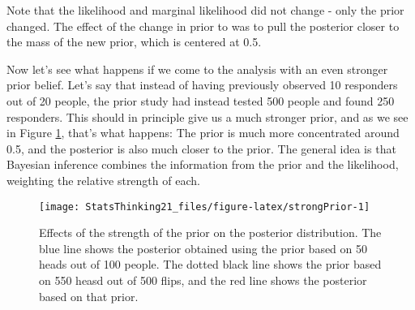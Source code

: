 \documentclass[]{book}
\newenvironment{Shaded}{\begin{snugshade}}{\end{snugshade}}
\newcommand{\KeywordTok}[1]{\textcolor[rgb]{0.13,0.29,0.53}{\textbf{#1}}}
\newcommand{\DataTypeTok}[1]{\textcolor[rgb]{0.13,0.29,0.53}{#1}}
\newcommand{\DecValTok}[1]{\textcolor[rgb]{0.00,0.00,0.81}{#1}}
\newcommand{\StringTok}[1]{\textcolor[rgb]{0.31,0.60,0.02}{#1}}
\newcommand{\CommentTok}[1]{\textcolor[rgb]{0.56,0.35,0.01}{\textit{#1}}}
\newcommand{\OperatorTok}[1]{\textcolor[rgb]{0.81,0.36,0.00}{\textbf{#1}}}
\newcommand{\NormalTok}[1]{#1}
\theoremstyle{definition}
\theoremstyle{definition}
\theoremstyle{definition}
\theoremstyle{remark}
\begin{document}
Note that the likelihood and marginal likelihood did not change - only
the prior changed. The effect of the change in prior to was to pull the
posterior closer to the mass of the new prior, which is centered at 0.5.

Now let's see what happens if we come to the analysis with an even
stronger prior belief. Let's say that instead of having previously
observed 10 responders out of 20 people, the prior study had instead
tested 500 people and found 250 responders. This should in principle
give us a much stronger prior, and as we see in Figure
\ref{fig:strongPrior}, that's what happens: The prior is much more
concentrated around 0.5, and the posterior is also much closer to the
prior. The general idea is that Bayesian inference combines the
information from the prior and the likelihood, weighting the relative
strength of each.

\begin{Shaded}
\end{Shaded}

\begin{figure}
\texttt{[image: StatsThinking21\_files/figure-latex/strongPrior-1]} \caption{Effects of the strength of the prior on the posterior distribution. The blue line shows the posterior obtained using the prior based on 50 heads out of 100 people.  The dotted black line shows the prior based on 550 heasd out of 500 flips, and the red line shows the posterior based on that prior.}\label{fig:strongPrior}
\end{figure}
\end{document}
